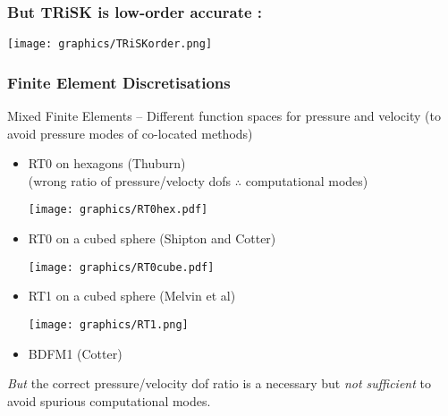  
\makeatletter{}\begin{frame}
\frametitle{But TRiSK is low-order accurate \frownie:}

\texttt{[image: graphics/TRiSKorder.png]}

\end{frame}

 
\makeatletter{}\begin{frame}
\frametitle{Finite Element Discretisations}

Mixed Finite Elements -- Different function spaces for pressure and velocity (to avoid pressure modes of co-located methods)

\pause
\begin{itemize}[<+->]
    \item
           \begin{minipage}[t]{0.65\linewidth}\raggedright
           RT0 on hexagons (Thuburn) \\
           (wrong ratio of pressure/velocty dofs $\therefore$ computational modes)
           \end{minipage}\hfill
           \begin{minipage}[c]{0.3\linewidth}
               \texttt{[image: graphics/RT0hex.pdf]}
           \end{minipage}
    \item
          \begin{minipage}[t]{0.65\linewidth}\raggedright
        RT0 on a cubed sphere (Shipton and Cotter)
          \end{minipage}\hfill
          \begin{minipage}[c]{0.3\linewidth}
              \texttt{[image: graphics/RT0cube.pdf]}
          \end{minipage}
    \item
          \begin{minipage}[t]{0.65\linewidth}\raggedright
              RT1 on a cubed sphere (Melvin et al)
          \end{minipage}\hfill
          \begin{minipage}[c]{0.3\linewidth}
      \texttt{[image: graphics/RT1.png]}
          \end{minipage}
    \item BDFM1 (Cotter)
\end{itemize}
\pause
{\em But} the correct pressure/velocity dof ratio is a necessary but {\em not sufficient} to avoid spurious computational modes.
\end{frame}

